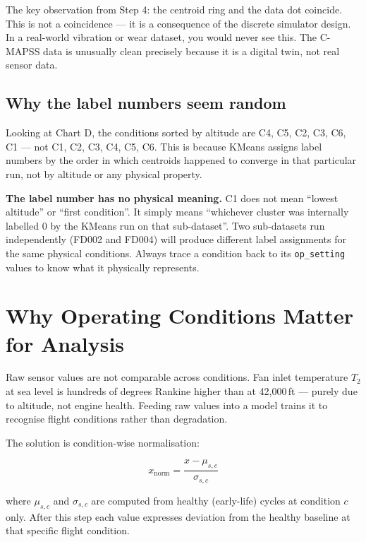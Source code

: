 \documentclass[11pt, a4paper]{article}
\begin{document}
The key observation from Step 4: the centroid ring and the
data dot coincide. This is not a coincidence --- it is a
consequence of the discrete simulator design. In a real-world
vibration or wear dataset, you would never see this. The
C-MAPSS data is unusually clean precisely because it is
a digital twin, not real sensor data.

\subsection{Why the label numbers seem random}

Looking at Chart D, the conditions sorted by altitude are
C4, C5, C2, C3, C6, C1 --- not C1, C2, C3, C4, C5, C6.
This is because KMeans assigns label numbers by the order
in which centroids happened to converge in that particular
run, not by altitude or any physical property.

\begin{keybox}
\textbf{The label number has no physical meaning.}
C1 does not mean ``lowest altitude'' or ``first condition''.
It simply means ``whichever cluster was internally labelled 0
by the KMeans run on that sub-dataset''. Two sub-datasets
run independently (FD002 and FD004) will produce different
label assignments for the same physical conditions.
Always trace a condition back to its \texttt{op\_setting}
values to know what it physically represents.
\end{keybox}


\section{Why Operating Conditions Matter for Analysis}

Raw sensor values are not comparable across conditions.
Fan inlet temperature $T_2$ at sea level is hundreds of
degrees Rankine higher than at 42{,}000\,ft --- purely due
to altitude, not engine health. Feeding raw values into a
model trains it to recognise flight conditions rather than
degradation.

The solution is condition-wise normalisation:

\begin{equation}
  x_{\text{norm}} = \frac{x - \mu_{s,c}}{\sigma_{s,c}}
\end{equation}

where $\mu_{s,c}$ and $\sigma_{s,c}$ are computed from
healthy (early-life) cycles at condition $c$ only.
After this step each value expresses deviation from the
healthy baseline at that specific flight condition.
\end{document}
